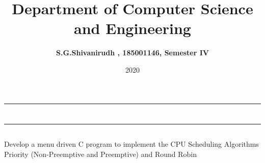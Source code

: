 \documentclass[12pt,letterpaper,,margin=0.75in]{article}
\title{\textbf{Department of Computer Science and Engineering}}
\author{\textbf{S.G.Shivanirudh , 185001146, Semester IV }}
\date{2020}
\begin{document}
\maketitle
\hrule
\section*{}
\hrule 
\bigskip \bigskip

\subsection*{}

\subsection*{}
\begin{flushleft}
Develop a menu driven C program to implement the CPU Scheduling Algorithms
Priority (Non-Preemptive and Preemptive) and Round Robin
\end{flushleft}

\subsection*{}
\begin{flushleft}
\end{flushleft}




\end{document}
